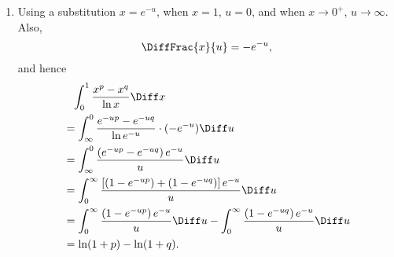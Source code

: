 \begin{enumerate}
    \item Using a substitution \(x = e^{-u}\), when \(x = 1\), \(u = 0\), and when \(x \to 0^{+}\), \(u \to \infty\). Also,
          \[
              \DiffFrac{x}{u} = -e^{-u},
          \]
          and hence
          \begin{align*}
               & \phantom{=} \int_{0}^{1} \frac{x^p - x^q}{\ln x} \Diff x                                                                                    \\
               & = \int_{\infty}^{0} \frac{e^{-up} - e^{-uq}}{\ln e^{-u}} \cdot (- e^{-u}) \Diff u                                                           \\
               & = \int_{\infty}^{0} \frac{\left(e^{-up} - e^{-uq}\right) e^{-u}}{u} \Diff u                                                                 \\
               & = \int_{0}^{\infty} \frac{\left[\left(1 - e^{-up}\right) + \left(1 - e^{-uq}\right)\right]e^{-u}}{u} \Diff u                                \\
               & = \int_{0}^{\infty} \frac{\left(1 - e^{-up}\right) e^{-u}}{u} \Diff u - \int_{0}^{\infty} \frac{\left(1 - e^{-uq}\right) e^{-u}}{u} \Diff u \\
               & = \ln(1 + p) - \ln(1 + q).
          \end{align*}
\end{enumerate}